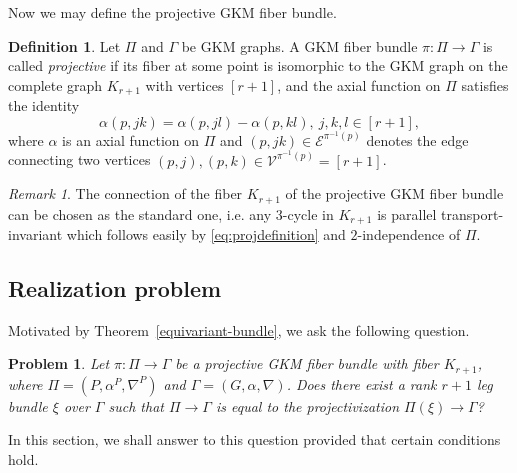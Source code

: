 \documentclass[12pt]{amsart}
\newtheorem{problem}[theorem]{Problem}
\theoremstyle{definition}
\newtheorem{definition}[theorem]{Definition}
\theoremstyle{remark}
\newtheorem{remark}[theorem]{Remark}
\numberwithin{equation}{section}
\begin{document}
Now we may define the projective GKM fiber bundle.
\begin{definition}
\label{general_proj_bdl}
Let $\Pi$ and $\Gamma$ be GKM graphs.
A GKM fiber bundle $\pi:\Pi\to \Gamma$ is called \textit{projective} if its fiber at some point is isomorphic to the GKM graph on the complete graph $K_{r+1}$ with vertices $[r+1]$, and the axial function on $\Pi$ satisfies the identity
\begin{equation}\label{eq:projdefinition}
\alpha(p,jk)=\alpha(p,jl)-\alpha(p,kl),\ j,k,l\in[r+1],
\end{equation}
where $\alpha$ is an axial function on $\Pi$ and $(p,jk)\in \mathcal{E}^{\pi^{-1}(p)}$
denotes the edge connecting two vertices $(p,j), (p,k)\in \mathcal{V}^{\pi^{-1}(p)}=[r+1]$.
\end{definition}

\begin{remark}
\label{remark_on_projectivization}
The connection of the fiber $K_{r+1}$ of the projective GKM fiber bundle can be chosen as the standard one, i.e. any $3$-cycle in $K_{r+1}$ is parallel transport-invariant which follows easily by \eqref{eq:projdefinition} and $2$-independence of $\Pi$.
\end{remark}

\subsection{Realization problem}
\label{sect:6.3}

Motivated by Theorem~\ref{equivariant-bundle}, we ask the following question.
\begin{problem}
Let $\pi:\Pi\to \Gamma$ be a projective GKM fiber bundle with fiber $K_{r+1}$, where
$\Pi=(P,\alpha^{P},\nabla^{P})$ and $\Gamma=(G,\alpha,\nabla)$.
Does there exist a rank $r+1$ leg bundle $\xi$ over $\Gamma$ such that $\Pi\to \Gamma$ is equal to the projectivization $\Pi(\xi)\to\Gamma$?
\end{problem}

In this section,
we shall answer to this question provided that certain conditions hold.
\end{document}
